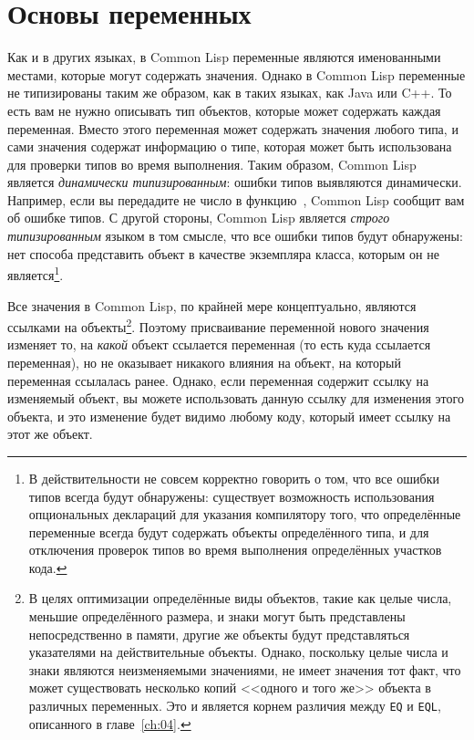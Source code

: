 \section{Основы переменных}

Как и в других языках, в Common Lisp переменные являются именованными местами, которые
могут содержать значения. Однако в Common Lisp переменные не типизированы таким же
образом, как в таких языках, как Java или C++. То есть вам не нужно описывать тип
объектов, которые может содержать каждая переменная. Вместо этого переменная может
содержать значения любого типа, и сами значения содержат информацию о типе, которая может
быть использована для проверки типов во время выполнения. Таким образом, Common Lisp
является \textit{динамически типизированным}: ошибки типов выявляются
динамически. Например, если вы передадите не число в функцию~\code{+}, Common Lisp сообщит
вам об ошибке типов. С другой стороны, Common Lisp является \textit{строго типизированным}
языком в том смысле, что все ошибки типов будут обнаружены: нет способа представить объект
в качестве экземпляра класса, которым он не является\footnote{В действительности не совсем
  корректно говорить о том, что все ошибки типов всегда будут обнаружены: существует
  возможность использования опциональных деклараций для указания компилятору того, что
  определённые переменные всегда будут содержать объекты определённого типа, и для
  отключения проверок типов во время выполнения определённых участков кода.}.

Все значения в Common Lisp, по крайней мере концептуально, являются ссылками на
объекты\footnote{В целях оптимизации определённые виды объектов, такие как целые числа,
  меньшие определённого размера, и знаки могут быть представлены непосредственно в памяти,
  другие же объекты будут представляться указателями на действительные объекты. Однако,
  поскольку целые числа и знаки являются неизменяемыми значениями, не имеет значения тот
  факт, что может существовать несколько копий <<одного и того же>> объекта в различных
  переменных. Это и является корнем различия между \lstinline{EQ} и \lstinline{EQL}, описанного
  в главе~\ref{ch:04}.}. Поэтому присваивание переменной нового значения изменяет то, на
  \textit{какой} объект ссылается переменная (то есть куда ссылается переменная), но не
  оказывает никакого влияния на объект, на который переменная ссылалась ранее. Однако,
  если переменная содержит ссылку на изменяемый объект, вы можете использовать данную
  ссылку для изменения этого объекта, и это изменение будет видимо любому коду, который
  имеет ссылку на этот же объект.

